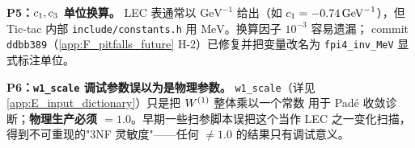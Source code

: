\begin{pitfallbox}
\textbf{P5：\(c_1, c_3\) 单位换算。}
LEC 表通常以 \(\mathrm{GeV}^{-1}\) 给出（如 \(c_1=-0.74\,\mathrm{GeV}^{-1}\)），但
Tic-tac 内部 \texttt{include/constants.h} 用 \(\mathrm{MeV}\)。换算因子 \(10^{-3}\) 容易遗漏；
commit \texttt{ddbb389}（\cref{app:F_pitfalls_future} H-2）已修复并把变量改名为
\texttt{fpi4\_inv\_MeV} 显式标注单位。
\end{pitfallbox}

\begin{pitfallbox}
\textbf{P6：\texttt{w1\_scale} 调试参数误以为是物理参数。}
\texttt{w1\_scale}（详见 \cref{app:E_input_dictionary}）只是把 \(W^{(1)}\) 整体乘以一个常数
用于 Padé 收敛诊断；\textbf{物理生产必须 \(=1.0\)}。早期一些扫参脚本误把这个当作 LEC 之一变化扫描，
得到不可重现的"3NF 灵敏度"——任何 \(\ne 1.0\) 的结果只有调试意义。
\end{pitfallbox}
